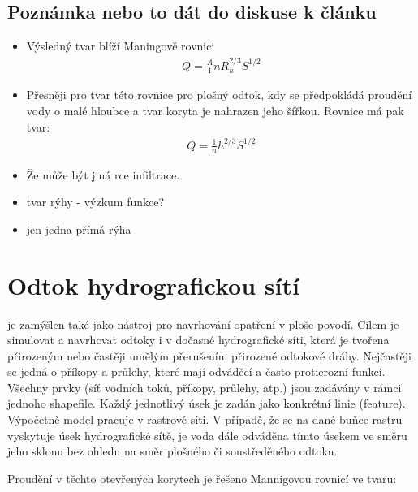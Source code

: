 




\subsection{Poznámka nebo to dát do diskuse k článku} 
\begin{itemize}
\item Výsledný tvar blíží Maningově rovnici
\begin{eqnarray}
Q =\frac A {1}{n} R_{h}^{2/3} S^{1/2}
\end{eqnarray}
\item Přesněji pro tvar této rovnice pro plošný odtok, kdy se předpokládá proudění vody  o malé hloubce a tvar koryta je nahrazen jeho šířkou. Rovnice má pak tvar:
\begin{eqnarray}
Q =\frac {1}{n} h^{2/3} S^{1/2}
\end{eqnarray}
\item Že může být jiná rce infiltrace.
\item tvar rýhy - výzkum funkce?
\item jen jedna přímá rýha
\end{itemize}

\section{Odtok hydrografickou sítí} \label{sec:tokyodtok}


\smod je zamýšlen také jako nástroj pro navrhování opatření v ploše povodí. Cílem je simulovat a navrhovat odtoky i v dočasné hydrografické síti, která je tvořena přirozeným nebo častěji umělým přerušením přirozené odtokové dráhy. Nejčastěji se jedná o příkopy a průlehy, které mají odváděcí a často protierozní funkci. 
Všechny prvky (síť vodních toků, příkopy, průlehy, atp.) jsou zadávány v rámci jednoho shapefile. Každý jednotlivý úsek je zadán jako konkrétní linie (feature). Výpočetně model pracuje v rastrové síti. V případě, že se na dané buňce rastru vyskytuje úsek hydrografické sítě, je voda dále odváděna tímto úsekem ve směru jeho sklonu  bez ohledu na směr plošného či soustředěného odtoku.


Proudění v těchto otevřených korytech je řešeno Mannigovou rovnicí ve tvaru:

